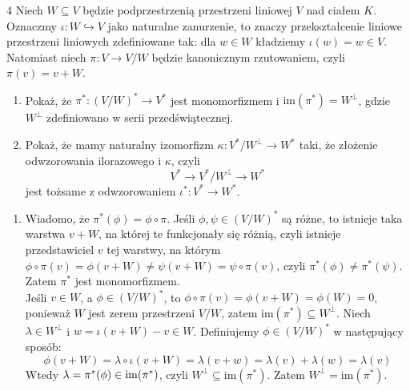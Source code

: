 \documentclass{../note}
\begin{document}
\begin{zadanie}{4}
Niech $W\subseteq V$ będzie podprzestrzenią przestrzeni liniowej $V$ nad ciałem $K$. Oznaczmy $\iota:W\hookrightarrow V$ jako naturalne zanurzenie, to znaczy przekształcenie liniowe przestrzeni liniowych zdefiniowane tak: dla $w\in W$ kładziemy $\iota(w)=w\in V$. Natomiast niech $\pi:V\rightarrow V/W$ będzie kanonicznym rzutowaniem, czyli $\pi(v)=v+W$.
\begin{enumerate}[label=(\alph*)]
    \item Pokaż, że $\pi^{*}:(V/W)^{*}\rightarrow V^{*}$ jest monomorfizmem i $\text{im}(\pi^{*})=W^{\perp}$, gdzie $W^{\perp}$ zdefiniowano w serii przedświątecznej.
    \item Pokaż, że mamy naturalny izomorfizm $\kappa:V^{*}/W^{\perp}\rightarrow W^{*}$ taki, że złożenie odwzorowania ilorazowego i $\kappa$, czyli
    $$ V^{*}\longrightarrow V^{*}/W^{\perp}\longrightarrow W^{*} $$
    jest tożsame z odwzorowaniem $\iota^{*}:V^{*}\rightarrow W^{*}$.
\end{enumerate}
\end{zadanie}
\begin{rozwiazanie}
\begin{enumerate}[label=(\alph*)]
    \item Wiadomo, że $\pi^*(\phi) = \phi \circ \pi$. Jeśli $\phi, \psi \in (V / W)^*$ są różne, to istnieje taka warstwa $v + W$, na której te funkcjonały się różnią, czyli istnieje przedstawiciel $v$ tej warstwy, na którym $\phi \circ \pi(v) = \phi(v + W) \neq \psi(v + W) = \psi \circ \pi(v)$, czyli $\pi^*(\phi) \neq \pi^*(\psi)$. Zatem $\pi^*$ jest monomorfizmem.\\
    Jeśli $v \in W$, a $\phi \in (V / W)^*$, to $\phi \circ \pi(v) = \phi(v + W) = \phi(W) = 0$, ponieważ $W$ jest zerem przestrzeni $V / W$, zatem $\text{im}(\pi^{*})\subseteq W^{\perp}$. Niech $\lambda \in W^\perp$ i $w = \iota(v + W) - v \in W$. Definiujemy $\phi \in (V / W)^*$ w następujący sposób:
    \[\phi(v + W) = \lambda\circ\iota(v + W) = \lambda(v+w) = \lambda(v) + \lambda(w) = \lambda(v)\]
    Wtedy $\lambda = \pi^*(\phi) \in \operatorname{im}(\pi^*)$, czyli $W^{\perp} \subseteq \text{im}(\pi^{*})$. Zatem $W^{\perp} = \text{im}(\pi^{*})$.
\end{enumerate}
\end{rozwiazanie}
\end{document}
